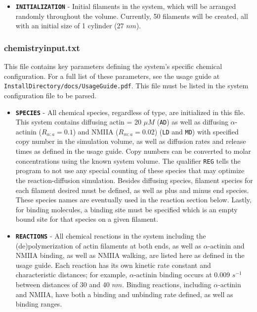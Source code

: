 \documentclass[11pt, oneside]{article}   	%
\begin{document}
\begin{itemize}
\item \texttt{\textbf{INITIALIZATION}} - Initial filaments in the system, which will be arranged randomly throughout the volume. Currently, 50 filaments will be created, all with an initial size of 1 cylinder (27 $nm$).

\end{itemize}

\subsubsection{chemistryinput.txt}

This file contains key parameters defining the system's specific chemical configuration. For a full list of these parameters, see the usage guide at \texttt{InstallDirectory/docs/UsageGuide.pdf}. This file must be listed in the system configuration file to be parsed.

\begin{itemize}

\item \texttt{\textbf{SPECIES}} - All chemical species, regardless of type, are initialized in this file. This system contains diffusing actin = 20 $\mu M$ (\texttt{AD}) as well as diffusing $\alpha$-actinin ($R_{\alpha:a}=0.1$) and NMIIA  ($R_{m:a}=0.02$) (\texttt{LD} and \texttt{MD}) with specified copy number in the simulation volume, as well as diffusion rates and release times as defined in the usage guide. Copy numbers can be converted to molar concentrations using the known system volume. The qualifier \texttt{REG} tells the program to not use any special counting of these species that may optimize the reaction-diffusion simulation. Besides diffusing species, filament species for each filament desired must be defined, as well as plus and minus end species. These species names are eventually used in the reaction section below. Lastly, for binding molecules, a binding site must be specified which is an empty bound site for that species on a given filament.

\item \texttt{\textbf{REACTIONS}} - All chemical reactions in the system including the (de)polymerization of actin filaments at both ends, as well as $\alpha$-actinin and NMIIA binding, as well as NMIIA walking, are listed here as defined in the usage guide. Each reaction has its own kinetic rate constant and characteristic distances; for example, $\alpha$-actinin binding occurs at 0.009 $s^{-1}$ between distances of 30 and 40 $nm$. Binding reactions, including $\alpha$-actinin and NMIIA, have both a binding and unbinding rate defined, as well as binding ranges.

\end{itemize}
\end{document}
